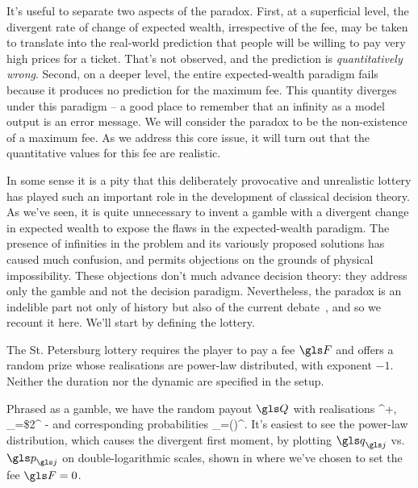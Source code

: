It's useful to separate two aspects of the paradox. First, at a superficial level, the divergent
rate of change of expected wealth, irrespective of the fee, may be taken to translate into
the real-world prediction that people will be willing to pay very high prices for a ticket. 
That's not observed, and the prediction is {\it quantitatively wrong}. Second, on a deeper 
level, the entire expected-wealth paradigm fails because it produces no prediction for 
the maximum fee. This quantity diverges under this paradigm -- a good place to remember
that an infinity as a model output is an error message. We will consider the paradox to be
the non-existence of a maximum fee. As we address this core issue, it will turn out that the
quantitative values for this fee are realistic.

In some sense it is a pity that this deliberately provocative and unrealistic lottery has played 
such an important role in the development of classical decision theory.  As we've seen, it is 
quite unnecessary to invent 
a gamble with a divergent change in expected wealth to expose the flaws in the expected-wealth 
paradigm. The presence of infinities in the problem and its variously proposed solutions has 
caused much confusion, and permits objections on the grounds of physical impossibility. These 
objections don't much advance decision theory: they address only the gamble and 
not the decision paradigm. Nevertheless, the paradox is an indelible part not only of history but 
also of the current debate~\cite{Peters2011b}, and so we recount it here. We'll start by defining 
the lottery.

The St. Petersburg lottery requires the player to pay a fee $\F$ and offers a random 
prize whose realisations are power-law distributed, with exponent $-1$. Neither the duration
nor the dynamic are specified in the setup. 

Phrased as a gamble, we have the random payout $\Q$ with realisations 
\be
\forall \gj \in {}^+, \q_{\gj}=\$2^{} -\F
{}
\ee
and corresponding probabilities 
\be
\p_\gj=\left(\right)^\gj.
\ee
It's easiest to see the power-law distribution, which causes the divergent first moment, by plotting
$\q_\gj$ vs. $\p_\gj$ on double-logarithmic scales, shown in  where we've
chosen to set the fee $\F=0$.

